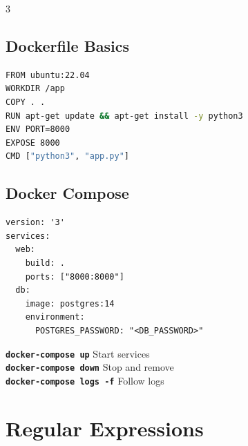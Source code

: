 \documentclass[7pt,landscape]{extarticle}
\newcommand{\cmd}[1]{\textcolor{csPrimary}{\texttt{\textbf{\fontsize{6pt}{7pt}\selectfont#1}}}}
\begin{document}
\begin{multicols*}{3}
\subsection*{Dockerfile Basics}
\begin{lstlisting}[language=bash]
FROM ubuntu:22.04
WORKDIR /app
COPY . .
RUN apt-get update && apt-get install -y python3
ENV PORT=8000
EXPOSE 8000
CMD ["python3", "app.py"]
\end{lstlisting}

\subsection*{Docker Compose}
\begin{lstlisting}
version: '3'
services:
  web:
    build: .
    ports: ["8000:8000"]
  db:
    image: postgres:14
    environment:
      POSTGRES_PASSWORD: "<DB_PASSWORD>"
\end{lstlisting}

\cmd{docker-compose up} \hfill Start services \\
\cmd{docker-compose down} \hfill Stop and remove \\
\cmd{docker-compose logs -f} \hfill Follow logs

\section*{Regular Expressions}


\end{multicols*}
\end{document}
